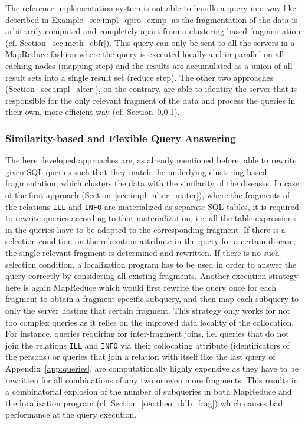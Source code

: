 The reference implementation system is not able to handle a query in a way like described in Example~\ref{sec:impl_qpro_exmp} as the fragmentation of the data
is arbitrarily computed and completely apart from a clustering-based fragmentation (cf. Section~\ref{sec:meth_cbfr}). This query can only be sent
to all the servers in a MapReduce \citep{MapReduce2004} fashion where the query is executed locally and in parallel on all caching nodes (mapping step) and the 
results are accumulated as a union of all result sets into a single result set (reduce step). The other two approaches (Section~\ref{sec:impl_alter}), on the
contrary, are able to identify the server that is responsible for the only relevant fragment of the data and process the queries in their own, more efficient
way (cf. Section~\ref{sec:impl_qpro_sbfq}).


\subsubsection{Similarity-based and Flexible Query Answering}
\label{sec:impl_qpro_sbfq}

The here developed approaches are, as already mentioned before, able to rewrite given SQL queries such that they match the underlying clustering-based
fragmentation, which clusters the data with the similarity of the diseases. In case of the first approach (Section~\ref{sec:impl_alter_mater}), where the 
fragments of the relations \verb!ILL! and
\verb!INFO! are materialized as separate SQL tables, it is required to rewrite queries according to that materialization, i.e. all the table expressions in the
queries have to be adapted to the corresponding fragment. If there is a selection condition on the relaxation attribute in the query for a certain disease, the
single relevant fragment is determined and rewritten. If there is no such selection condition, a localization program has to be used in order to answer the 
query correctly by considering all existing fragments. Another execution strategy here is again MapReduce \citep{MapReduce2004} which would first rewrite the 
query once for each fragment to obtain a fragment-specific subquery, and then map each subquery to only the server hosting that certain fragment. This strategy
only works for not too complex queries as it relies on the improved data locality of the collocation. For instance, queries requiring for inter-fragment joins,
i.e. queries that do not join the relations \verb!ILL! and \verb!INFO! via their collocating attribute (identificators of the persons) or queries that join a
relation with itself like the last query of Appendix~\ref{app:queries}, are computationally highly expensive as they have to be rewritten for all combinations
of any two or even more fragments. This results in a combinatorial explosion of the number of subqueries in both MapReduce and the localization program 
(cf. Section~\ref{sec:theo_ddb_frag}) which causes bad performance at the query execution.

